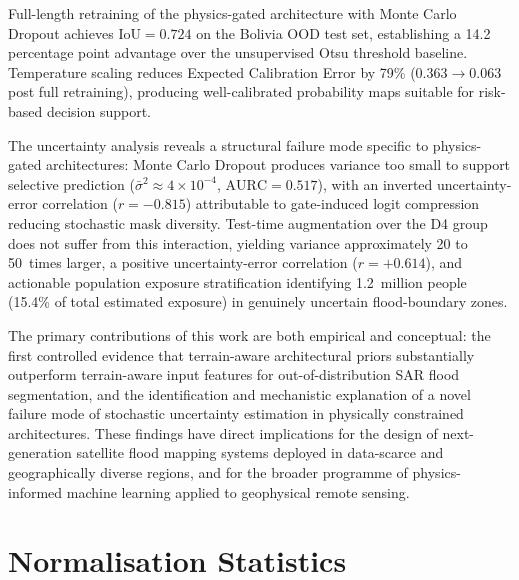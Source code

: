 \documentclass[12pt,oneside]{report}
\newcommand{\IoU}{\mathrm{IoU}}
\newcommand{\AURC}{\mathrm{AURC}}
\begin{document}
Full-length retraining of the physics-gated architecture with Monte Carlo
Dropout achieves $\IoU = 0.724$ on the Bolivia OOD test set, establishing a
14.2 percentage point advantage over the unsupervised Otsu threshold baseline.
Temperature scaling reduces Expected Calibration Error by 79\% ($0.363 \to
0.063$ post full retraining), producing well-calibrated probability maps
suitable for risk-based decision support.

The uncertainty analysis reveals a structural failure mode specific to
physics-gated architectures: Monte Carlo Dropout produces variance too small
to support selective prediction ($\bar{\sigma}^2 \approx 4 \times 10^{-4}$,
$\AURC = 0.517$), with an inverted uncertainty-error correlation
($r = -0.815$) attributable to gate-induced logit compression reducing
stochastic mask diversity.
Test-time augmentation over the D4 group does not suffer from this interaction,
yielding variance approximately 20 to 50~times larger, a positive
uncertainty-error correlation ($r = +0.614$), and actionable population
exposure stratification identifying 1.2~million people (15.4\% of total
estimated exposure) in genuinely uncertain flood-boundary zones.

The primary contributions of this work are both empirical and conceptual: the
first controlled evidence that terrain-aware architectural priors substantially
outperform terrain-aware input features for out-of-distribution SAR flood
segmentation, and the identification and mechanistic explanation of a novel
failure mode of stochastic uncertainty estimation in physically constrained
architectures.
These findings have direct implications for the design of next-generation
satellite flood mapping systems deployed in data-scarce and geographically
diverse regions, and for the broader programme of physics-informed machine
learning applied to geophysical remote sensing.

\newpage


\appendix

\chapter{Normalisation Statistics}
\label{app:norm_stats}
\end{document}
